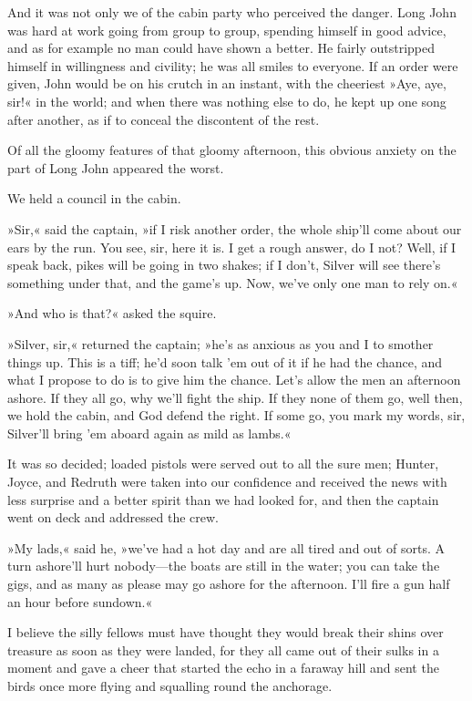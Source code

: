 And it was not only we of the cabin party who perceived the danger. Long John was hard at work going from group to group, spending himself in good advice, and as for example no man could have shown a better. He fairly outstripped himself in willingness and civility; he was all smiles to everyone. If an order were given, John would be on his crutch in an instant, with the cheeriest »Aye, aye, sir!« in the world; and when there was nothing else to do, he kept up one song after another, as if to conceal the discontent of the rest.

Of all the gloomy features of that gloomy afternoon, this obvious anxiety on the part of Long John appeared the worst.

We held a council in the cabin.

»Sir,« said the captain, »if I risk another order, the whole ship'll come about our ears by the run. You see, sir, here it is. I get a rough answer, do I not? Well, if I speak back, pikes will be going in two shakes; if I don't, Silver will see there's something under that, and the game's up. Now, we've only one man to rely on.«

»And who is that?« asked the squire.

»Silver, sir,« returned the captain; »he's as anxious as you and I to smother things up. This is a tiff; he'd soon talk 'em out of it if he had the chance, and what I propose to do is to give him the chance. Let's allow the men an afternoon ashore. If they all go, why we'll fight the ship. If they none of them go, well then, we hold the cabin, and God defend the right. If some go, you mark my words, sir, Silver'll bring 'em aboard again as mild as lambs.«

It was so decided; loaded pistols were served out to all the sure men; Hunter, Joyce, and Redruth were taken into our confidence and received the news with less surprise and a better spirit than we had looked for, and then the captain went on deck and addressed the crew.

»My lads,« said he, »we've had a hot day and are all tired and out of sorts. A turn ashore'll hurt nobody—the boats are still in the water; you can take the gigs, and as many as please may go ashore for the afternoon. I'll fire a gun half an hour before sundown.«

I believe the silly fellows must have thought they would break their shins over treasure as soon as they were landed, for they all came out of their sulks in a moment and gave a cheer that started the echo in a faraway hill and sent the birds once more flying and squalling round the anchorage.

